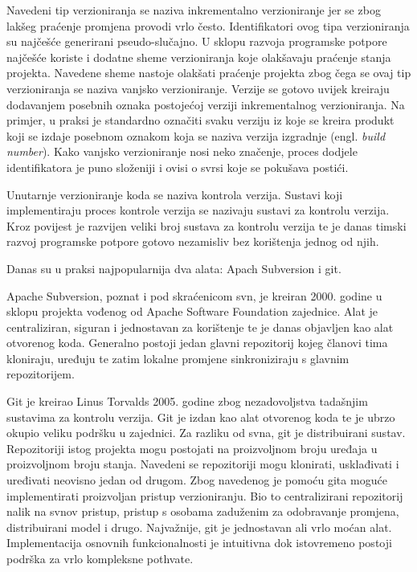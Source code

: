 \documentclass[times, utf8, diplomski, numeric]{fer}
\newcommand{\eng}[1]{(engl. \textit{#1})}
\begin{document}
Navedeni tip verzioniranja se naziva inkrementalno verzioniranje jer se zbog lakšeg praćenje promjena provodi vrlo često. Identifikatori ovog tipa verzioniranja su najčešće generirani pseudo-slučajno. U sklopu razvoja programske potpore najčešće koriste i dodatne sheme verzioniranja koje olakšavaju praćenje stanja projekta. Navedene sheme nastoje olakšati praćenje projekta zbog čega se ovaj tip verzioniranja se naziva vanjsko verzioniranje. Verzije se gotovo uvijek kreiraju dodavanjem posebnih oznaka postojećoj verziji inkrementalnog verzioniranja. Na primjer, u praksi je standardno označiti svaku verziju iz koje se kreira produkt koji se izdaje posebnom oznakom koja se naziva verzija izgradnje \eng{build number}. Kako vanjsko verzioniranje nosi neko značenje, proces dodjele identifikatora je puno složeniji i ovisi o svrsi koje se pokušava postići.

Unutarnje verzioniranje koda se naziva kontrola verzija\citep{wiki:VersionControl}. Sustavi koji implementiraju proces kontrole verzija se nazivaju sustavi za kontrolu verzija. Kroz povijest je razvijen veliki broj sustava za kontrolu verzija te je danas timski razvoj programske potpore gotovo nezamisliv bez korištenja jednog od njih.

Danas su u praksi najpopularnija dva alata: Apach Subversion i git.

Apache Subversion, poznat i pod skraćenicom svn, je kreiran 2000. godine u sklopu projekta vođenog od Apache Software Foundation zajednice. Alat je centraliziran, siguran i jednostavan za korištenje te je danas objavljen kao alat otvorenog koda. Generalno postoji jedan glavni repozitorij kojeg članovi tima kloniraju, uređuju te zatim lokalne promjene sinkroniziraju s glavnim repozitorijem.

Git je kreirao Linus Torvalds 2005. godine zbog nezadovoljstva tadašnjim sustavima za kontrolu verzija. Git je izdan kao alat otvorenog koda te je ubrzo okupio veliku podršku u zajednici. Za razliku od svna, git je distribuirani sustav. Repozitoriji istog projekta mogu postojati na proizvoljnom broju uređaja u proizvoljnom broju stanja. Navedeni se repozitoriji mogu klonirati, usklađivati i uređivati neovisno jedan od drugom. Zbog navedenog je pomoću gita moguće implementirati proizvoljan pristup verzioniranju. Bio to centralizirani repozitorij nalik na svnov pristup, pristup s osobama zaduženim za odobravanje promjena, distribuirani model i drugo. Najvažnije, git je jednostavan ali vrlo moćan alat. Implementacija osnovnih funkcionalnosti je intuitivna dok istovremeno postoji podrška za vrlo kompleksne pothvate.
\end{document}

